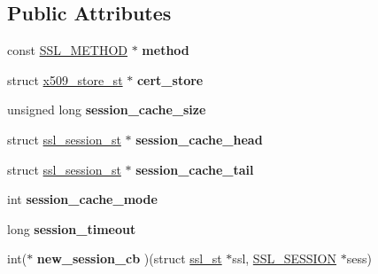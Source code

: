 \subsection*{Public Attributes}
\begin{DoxyCompactItemize}
\item 
\mbox{\label{structssl__ctx__st_a9e4773d3ec5b1a80abab92390015c576}} 
const \hyperlink{structssl__method__st}{S\+S\+L\+\_\+\+M\+E\+T\+H\+OD} $\ast$ {\bfseries method}
\item 
\mbox{\label{structssl__ctx__st_a8b6658b3bc3acb20908f2541056e3949}} 
struct \hyperlink{structx509__store__st}{x509\+\_\+store\+\_\+st} $\ast$ {\bfseries cert\+\_\+store}
\item 
\mbox{\label{structssl__ctx__st_af715c6f8caa8c192423ad5abfa211e6e}} 
unsigned long {\bfseries session\+\_\+cache\+\_\+size}
\item 
\mbox{\label{structssl__ctx__st_a3683adb75792a407eee86f042a7c7c68}} 
struct \hyperlink{structssl__session__st}{ssl\+\_\+session\+\_\+st} $\ast$ {\bfseries session\+\_\+cache\+\_\+head}
\item 
\mbox{\label{structssl__ctx__st_a1524f4319d24d011a575b8e9a70a0065}} 
struct \hyperlink{structssl__session__st}{ssl\+\_\+session\+\_\+st} $\ast$ {\bfseries session\+\_\+cache\+\_\+tail}
\item 
\mbox{\label{structssl__ctx__st_a957af083f0d87b4347e29788bd7e00e5}} 
int {\bfseries session\+\_\+cache\+\_\+mode}
\item 
\mbox{\label{structssl__ctx__st_a7b165f0e9fbde0499dedb660cdf0d756}} 
long {\bfseries session\+\_\+timeout}
\item 
\mbox{\label{structssl__ctx__st_a114da734a32555bec7ac1543e7fcef11}} 
int($\ast$ {\bfseries new\+\_\+session\+\_\+cb} )(struct \hyperlink{structssl__st}{ssl\+\_\+st} $\ast$ssl, \hyperlink{structssl__session__st}{S\+S\+L\+\_\+\+S\+E\+S\+S\+I\+ON} $\ast$sess)
\item 
\mbox{\label{structssl__ctx__st_a52d5ac51adc42ec8253a089cbc25afcc}} 

\end{DoxyCompactItemize}
